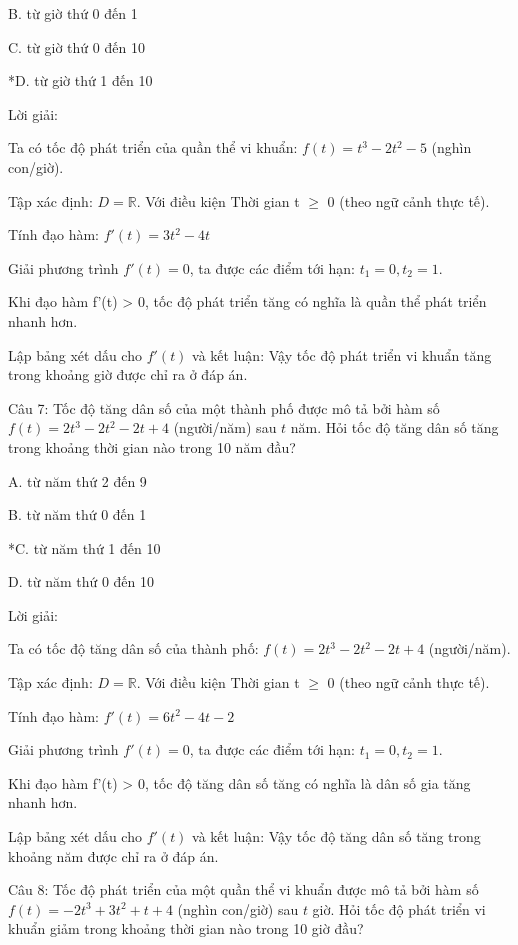 \documentclass[a4paper,12pt]{article}
\begin{document}
B. từ giờ thứ 0 đến 1

C. từ giờ thứ 0 đến 10

*D. từ giờ thứ 1 đến 10

Lời giải:

Ta có tốc độ phát triển của quần thể vi khuẩn: \(f(t) = t^{3}- 2t^{2}- 5\) (nghìn con/giờ).

Tập xác định: \(D = \mathbb{R}\).
Với điều kiện Thời gian t $\geq$ 0 (theo ngữ cảnh thực tế).

Tính đạo hàm:
\(f'(t) = 3t^{2}- 4t\)

Giải phương trình \(f'(t) = 0\), ta được các điểm tới hạn:
\(t_1 = 0, t_2 = 1\).



Khi đạo hàm f'(t) > 0, tốc độ phát triển tăng có nghĩa là quần thể phát triển nhanh hơn.

Lập bảng xét dấu cho \(f'(t)\) và kết luận: Vậy tốc độ phát triển vi khuẩn tăng trong khoảng giờ được chỉ ra ở đáp án.



Câu 7: Tốc độ tăng dân số của một thành phố được mô tả bởi hàm số \(f(t) = 2t^{3}- 2t^{2}- 2t+ 4\) (người/năm) sau \(t\) năm. 
            Hỏi tốc độ tăng dân số tăng trong khoảng thời gian nào trong 10 năm đầu?

A. từ năm thứ 2 đến 9

B. từ năm thứ 0 đến 1

*C. từ năm thứ 1 đến 10

D. từ năm thứ 0 đến 10

Lời giải:

Ta có tốc độ tăng dân số của thành phố: \(f(t) = 2t^{3}- 2t^{2}- 2t+ 4\) (người/năm).

Tập xác định: \(D = \mathbb{R}\).
Với điều kiện Thời gian t $\geq$ 0 (theo ngữ cảnh thực tế).

Tính đạo hàm:
\(f'(t) = 6t^{2}- 4t- 2\)

Giải phương trình \(f'(t) = 0\), ta được các điểm tới hạn:
\(t_1 = 0, t_2 = 1\).



Khi đạo hàm f'(t) > 0, tốc độ tăng dân số tăng có nghĩa là dân số gia tăng nhanh hơn.

Lập bảng xét dấu cho \(f'(t)\) và kết luận: Vậy tốc độ tăng dân số tăng trong khoảng năm được chỉ ra ở đáp án.



Câu 8: Tốc độ phát triển của một quần thể vi khuẩn được mô tả bởi hàm số \(f(t) = -2t^{3}+ 3t^{2}+ t+ 4\) (nghìn con/giờ) sau \(t\) giờ. 
            Hỏi tốc độ phát triển vi khuẩn giảm trong khoảng thời gian nào trong 10 giờ đầu?
\end{document}
